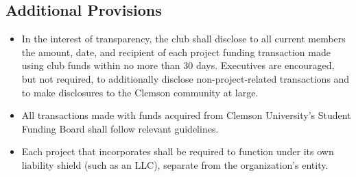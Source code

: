\documentclass{article}
\begin{document}
\subsection{Additional Provisions}

\begin{itemize}
    \item In the interest of transparency, the club shall disclose to all current members the amount, date, and recipient of each project funding transaction made using club funds within no more than 30 days. Executives are encouraged, but not required, to additionally disclose non-project-related transactions and to make disclosures to the Clemson community at large.
    \item All transactions made with funds acquired from Clemson University's Student Funding Board shall follow relevant guidelines. 
    \item Each project that incorporates shall be required to function under its own liability shield (such as an LLC), separate from the organization's entity.
\end{itemize}
\end{document}
